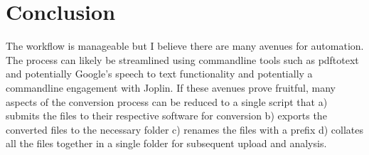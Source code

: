 \documentclass{article}
\begin{document}
\section{Conclusion}
The workflow is manageable but I believe there are many avenues for automation. The process can likely be streamlined using commandline tools such as pdftotext and potentially Google's speech to text functionality and potentially a commandline engagement with Joplin. If these avenues prove fruitful, many aspects of the conversion process can be reduced to a single script that a) submits the files to their respective software for conversion b) exports the converted files to the necessary folder c) renames the files with a prefix d) collates all the files together in a single folder for subsequent upload and analysis.\par
\end{document}
